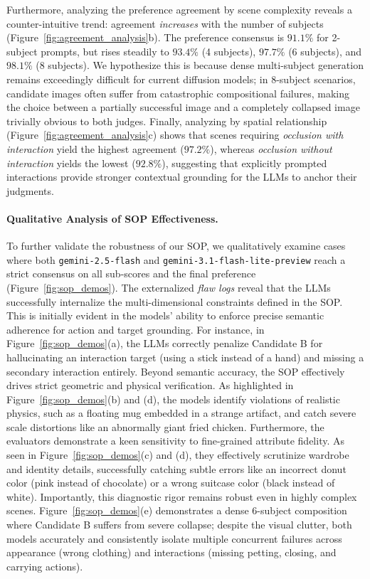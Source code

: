 \documentclass{article}
\begin{document}
Furthermore, analyzing the preference agreement by scene complexity reveals a counter-intuitive trend: agreement \emph{increases} with the number of subjects (Figure~\ref{fig:agreement_analysis}b). The preference consensus is $91.1\%$ for 2-subject prompts, but rises steadily to $93.4\%$ (4 subjects), $97.7\%$ (6 subjects), and $98.1\%$ (8 subjects). We hypothesize this is because dense multi-subject generation remains exceedingly difficult for current diffusion models; in 8-subject scenarios, candidate images often suffer from catastrophic compositional failures, making the choice between a partially successful image and a completely collapsed image trivially obvious to both judges. Finally, analyzing by spatial relationship (Figure~\ref{fig:agreement_analysis}c) shows that scenes requiring \emph{occlusion with interaction} yield the highest agreement ($97.2\%$), whereas \emph{occlusion without interaction} yields the lowest ($92.8\%$), suggesting that explicitly prompted interactions provide stronger contextual grounding for the LLMs to anchor their judgments.

\paragraph{Qualitative Analysis of SOP Effectiveness.}
To further validate the robustness of our SOP, we qualitatively examine cases where both \texttt{gemini-2.5-flash} and \texttt{gemini-3.1-flash-lite-preview} reach a strict consensus on all sub-scores and the final preference (Figure~\ref{fig:sop_demos}). The externalized \emph{flaw logs} reveal that the LLMs successfully internalize the multi-dimensional constraints defined in the SOP. This is initially evident in the models' ability to enforce precise semantic adherence for action and target grounding. For instance, in Figure~\ref{fig:sop_demos}(a), the LLMs correctly penalize Candidate B for hallucinating an interaction target (using a stick instead of a hand) and missing a secondary interaction entirely. Beyond semantic accuracy, the SOP effectively drives strict geometric and physical verification. As highlighted in Figure~\ref{fig:sop_demos}(b) and (d), the models identify violations of realistic physics, such as a floating mug embedded in a strange artifact, and catch severe scale distortions like an abnormally giant fried chicken. Furthermore, the evaluators demonstrate a keen sensitivity to fine-grained attribute fidelity. As seen in Figure~\ref{fig:sop_demos}(c) and (d), they effectively scrutinize wardrobe and identity details, successfully catching subtle errors like an incorrect donut color (pink instead of chocolate) or a wrong suitcase color (black instead of white). Importantly, this diagnostic rigor remains robust even in highly complex scenes. Figure~\ref{fig:sop_demos}(e) demonstrates a dense 6-subject composition where Candidate B suffers from severe collapse; despite the visual clutter, both models accurately and consistently isolate multiple concurrent failures across appearance (wrong clothing) and interactions (missing petting, closing, and carrying actions).
\end{document}
